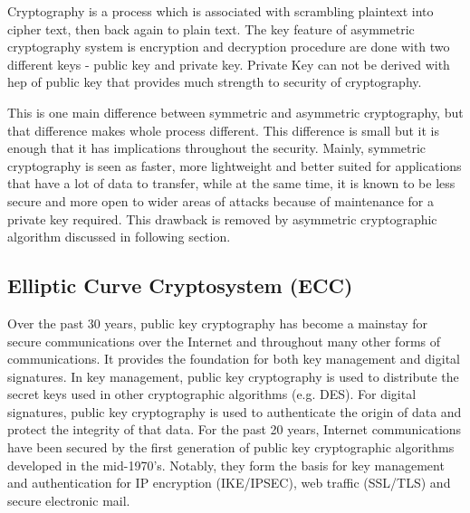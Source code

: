 \documentclass[12pt,journal,compsoc]{IEEEtran}
\begin{document}


Cryptography is a process which is associated with scrambling plaintext into cipher text, then back again to plain text. The key feature of asymmetric cryptography system is encryption and decryption procedure are done with two different keys - public key and private key. Private Key can not be derived with hep of public key that provides much strength to security of cryptography.

This is one main difference between symmetric and asymmetric cryptography, but that difference makes whole process different. This difference is small but it is enough that it has implications throughout the security. Mainly, symmetric cryptography is seen as faster, more lightweight and better suited for applications that have a lot of data to transfer, while at the same time, it is known to be less secure and more open to wider areas of attacks because of maintenance for a private key required. This drawback is removed by asymmetric cryptographic algorithm discussed in following section.

\subsection{{Elliptic Curve Cryptosystem (ECC)\cite{ecc}}}
Over the past 30 years, public key cryptography has become a mainstay for secure communications over the Internet and throughout many other forms of communications. It provides the foundation for both key management and digital signatures. In key management, public key cryptography is used to distribute the secret keys used in other cryptographic algorithms (e.g. DES). For digital signatures, public key cryptography is used to authenticate the origin of data and protect the integrity of that data. For the past 20 years, Internet communications have been secured by the first generation of public key cryptographic algorithms developed in the mid-1970's. Notably, they form the basis for key management and authentication for IP encryption (IKE/IPSEC), web traffic (SSL/TLS) and secure electronic mail. 
\end{document}
